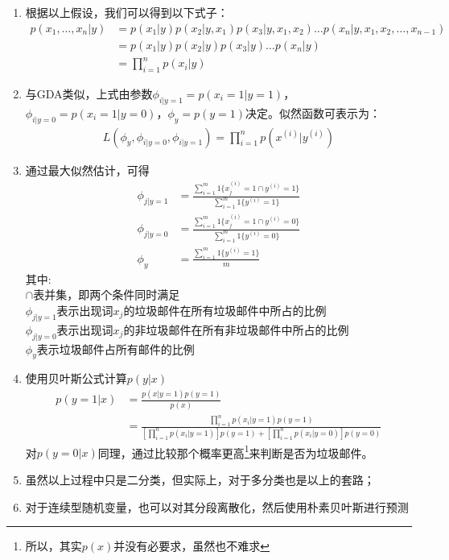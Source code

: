 \begin{enumerate}
\begin{enumerate}
		\item 根据以上假设，我们可以得到以下式子：
		\begin{align}
			p(x_1, \dots, x_n|y) &= p(x_1|y)p(x_2|y, x_1)p(x_3|y, x_1, x_2)\dots p(x_n|y, x_1, x_2, \dots, x_{n-1}) \\
			&= p(x_1|y)p(x_2|y)p(x_3|y)\dots p(x_n|y) \\
			&= \prod_{i=1}^{n}p(x_i|y)
		\end{align}
		\item 与GDA类似，上式由参数$\phi_{i|y=1}=p(x_i=1|y=1)$，$\phi_{i|y=0}=p(x_i=1|y=0)$，$\phi_y=p(y=1)$决定。似然函数可表示为：
		\begin{align}
			L(\phi_y, \phi_{i|y=0}, \phi_{i|y=1}) = \prod_{i=1}^{n}p(x^{(i)}|y^{(i)})
		\end{align}
		\item 通过最大似然估计，可得
		\begin{align}
			\phi_{j|y=1} &= \frac{\sum_{i=1}^{m}1\{x_j^{(i)}=1 \cap y^{(i)}=1\}}{\sum_{i=1}^{m}1\{y^{(i)}=1\}} \\
			\phi_{j|y=0} &= \frac{\sum_{i=1}^{m}1\{x_j^{(i)}=1 \cap y^{(i)}=0\}}{\sum_{i=1}^{m}1\{y^{(i)}=0\}} \\
			\phi_y &= \frac{\sum_{i=1}^{m}1\{y^{(i)}=1\}}{m}
		\end{align}
		其中: \\
		$\cap$表并集，即两个条件同时满足 \\
		$\phi_{j|y=1}$表示出现词$x_j$的垃圾邮件在所有垃圾邮件中所占的比例 \\
		$\phi_{j|y=0}$表示出现词$x_j$的非垃圾邮件在所有非垃圾邮件中所占的比例 \\
		$\phi_y$表示垃圾邮件占所有邮件的比例
		\item 使用贝叶斯公式计算$p(y|x)$
		\begin{align}
			p(y=1|x) &= \frac{p(x|y=1)p(y=1)}{p(x)} \\
			&= \frac{\prod_{i=1}^{n}p(x_i|y=1)p(y=1)}{\left[\prod_{i=1}^{n}p(x_i|y=1)\right]p(y=1)+\left[\prod_{i=1}^{n}p(x_i|y=0)\right]p(y=0)}
		\end{align}
		对$p(y=0|x)$同理，通过比较那个概率更高\footnote{所以，其实$p(x)$并没有必要求，虽然也不难求}来判断是否为垃圾邮件。
		\item 虽然以上过程中只是二分类，但实际上，对于多分类也是以上的套路；
		\item 对于连续型随机变量，也可以对其分段离散化，然后使用朴素贝叶斯进行预测
	\end{enumerate}
\end{enumerate}

